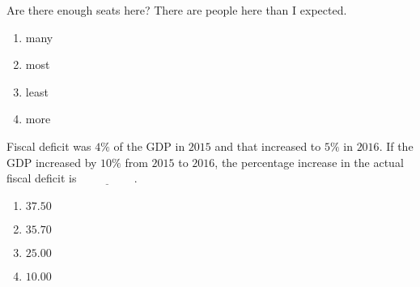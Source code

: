 	\item Are there enough seats here? There are \underline{\hspace{2cm}} people here than I expected.
		\begin{enumerate}                           
                        \item many                          
                        \item most                          
                        \item least
                        \item more
                \end{enumerate}

	\item Fiscal deficit was $4\%$ of the GDP in $2015$ and that increased to $5\%$ in $2016$. If the GDP increased by $10\%$ from $2015$ to $2016$, the percentage increase in the actual fiscal deficit is $\underline{\hspace{2cm}}$.
		\begin{enumerate}                           
                        \item $37.50$                      
                        \item $35.70$               
                        \item $25.00$
                        \item $10.00$
                \end{enumerate}

